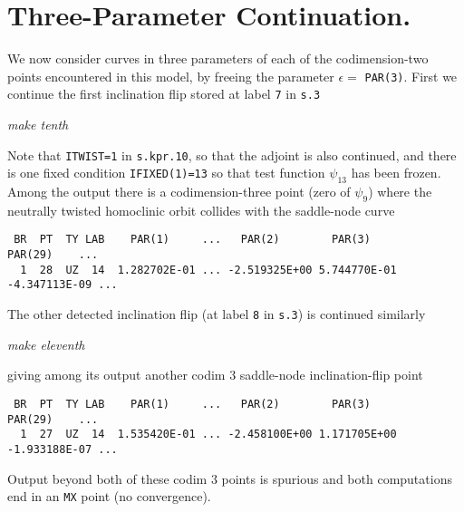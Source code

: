 \documentclass[12pt]{report}
\def\eps{\epsilon}
\begin{document}
\section{Three-Parameter Continuation.}
We now consider curves in three parameters of each of
the codimension-two points encountered in this model, by
freeing the parameter $\eps=$ {\tt PAR(3)}.
First we continue the first inclination flip stored at label
{\tt 7} in {\tt s.3}
\begin{center}
\it make tenth
\end{center}
Note that {\tt ITWIST=1} in {\tt s.kpr.10}, so that the adjoint is also
continued, and there is one fixed condition {\tt IFIXED(1)=13} so that
test function $\psi_{13}$ has been frozen.
Among the output there is a codimension-three point (zero of $\psi_9$)
where the neutrally twisted homoclinic orbit collides with the saddle-node
curve
\begin{verbatim}
 BR  PT  TY LAB    PAR(1)     ...   PAR(2)        PAR(3)        PAR(29)    ...     
  1  28  UZ  14  1.282702E-01 ... -2.519325E+00 5.744770E-01 -4.347113E-09 ...
\end{verbatim}
The other detected inclination flip (at label {\tt 8} in {\tt s.3}) is continued
similarly
\begin{center}
\it make eleventh
\end{center}
giving among its output another codim 3 saddle-node inclination-flip point
\begin{verbatim} 
 BR  PT  TY LAB    PAR(1)     ...   PAR(2)        PAR(3)        PAR(29)    ...  
  1  27  UZ  14  1.535420E-01 ... -2.458100E+00 1.171705E+00 -1.933188E-07 ... 
\end{verbatim}
Output beyond both of these codim 3 points is spurious and both computations end in
an {\tt MX} point (no convergence).
\end{document}

